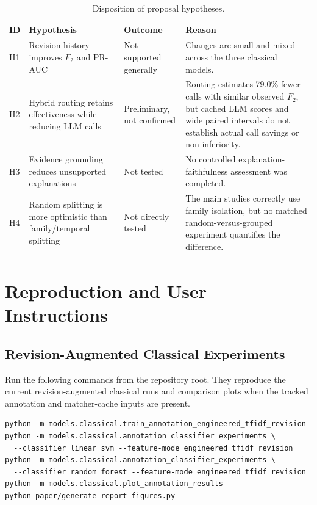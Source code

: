 \documentclass[12pt,a4paper,oneside]{report}
\begin{document}
\begin{table}[!tbp]
\caption{Disposition of proposal hypotheses.}
\label{tab:hypothesis-traceability}
\centering
\small
\setlength{\tabcolsep}{4pt}
\begin{tabularx}{\textwidth}{>{\raggedright\arraybackslash}p{}>{\raggedright\arraybackslash}p{}>{\raggedright\arraybackslash}p{}Y}
\toprule
ID & Hypothesis & Outcome & Reason \tabularnewline
\midrule
H1 & Revision history improves $F_2$ and PR-AUC & Not supported generally & Changes are small and mixed across the three classical models. \tabularnewline
H2 & Hybrid routing retains effectiveness while reducing LLM calls & Preliminary, not confirmed & Routing estimates 79.0\% fewer calls with similar observed $F_2$, but cached LLM scores and wide paired intervals do not establish actual call savings or non-inferiority. \tabularnewline
H3 & Evidence grounding reduces unsupported explanations & Not tested & No controlled explanation-faithfulness assessment was completed. \tabularnewline
H4 & Random splitting is more optimistic than family/temporal splitting & Not directly tested & The main studies correctly use family isolation, but no matched random-versus-grouped experiment quantifies the difference. \tabularnewline
\bottomrule
\end{tabularx}
\end{table}

\chapter{Reproduction and User Instructions}

\section{Revision-Augmented Classical Experiments}

Run the following commands from the repository root. They reproduce the current revision-augmented classical runs and comparison plots when the tracked annotation and matcher-cache inputs are present.

\begin{verbatim}
python -m models.classical.train_annotation_engineered_tfidf_revision
python -m models.classical.annotation_classifier_experiments \
  --classifier linear_svm --feature-mode engineered_tfidf_revision
python -m models.classical.annotation_classifier_experiments \
  --classifier random_forest --feature-mode engineered_tfidf_revision
python -m models.classical.plot_annotation_results
python paper/generate_report_figures.py
\end{verbatim}
\end{document}

